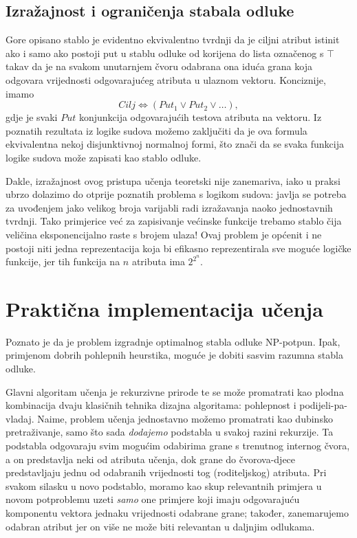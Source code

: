 \documentclass[12pt,a4paper]{article}
\begin{document}
\subsection{Izražajnost i ograničenja stabala odluke}
Gore opisano stablo je evidentno ekvivalentno tvrdnji da je ciljni atribut istinit ako i samo ako postoji put u stablu odluke
od korijena do lista označenog s $\top$ takav da je na svakom unutarnjem čvoru odabrana ona iduća grana koja odgovara vrijednosti odgovarajućeg
atributa u ulaznom vektoru. Konciznije, imamo
\begin{equation*}
    Cilj\Leftrightarrow(Put_1\lor Put_2\lor\ldots),
\end{equation*}
gdje je svaki $Put$ konjunkcija odgovarajućih testova atributa na vektoru. Iz poznatih rezultata iz logike sudova možemo zaključiti
da je ova formula ekvivalentna nekoj disjunktivnoj normalnoj formi, što znači da se svaka funkcija logike sudova može zapisati
kao stablo odluke.

Dakle, izražajnost ovog pristupa učenja teoretski nije zanemariva, iako u praksi ubrzo dolazimo do otprije poznatih problema s logikom sudova:
javlja se potreba za uvođenjem jako velikog broja varijabli radi izražavanja naoko jednostavnih tvrdnji. Tako primjerice već za
zapisivanje većinske funkcije trebamo stablo čija veličina eksponencijalno raste s brojem ulaza! Ovaj problem je općenit i ne postoji
niti jedna reprezentacija koja bi efikasno reprezentirala sve moguće logičke funkcije, jer tih funkcija na $n$ atributa ima
$2^{2^n}$. 

\section{Praktična implementacija učenja}
Poznato je da je problem izgradnje optimalnog stabla odluke NP-potpun.
Ipak, primjenom dobrih pohlepnih heurstika, moguće je dobiti sasvim razumna stabla odluke.


Glavni algoritam učenja je rekurzivne prirode te se može promatrati kao plodna kombinacija dvaju klasičnih tehnika dizajna algoritama:
pohlepnost i podijeli-pa-vladaj. Naime, problem učenja jednostavno možemo promatrati kao dubinsko pretraživanje, samo što sada
\emph{dodajemo} podstabla u svakoj razini rekurzije. Ta podstabla odgovaraju svim mogućim odabirima grane s trenutnog internog čvora, a on predstavlja
neki od atributa učenja, dok grane do čvorova-djece predstavljaju jednu od odabranih vrijednosti tog (roditeljskog) atributa.
Pri svakom silasku u novo podstablo, moramo kao skup relevantnih primjera u novom potproblemu uzeti \emph{samo} one
primjere koji imaju odgovarajuću komponentu vektora jednaku vrijednosti odabrane grane; također, zanemarujemo odabran atribut jer on više
ne može biti relevantan u daljnjim odlukama.
 
\end{document}
